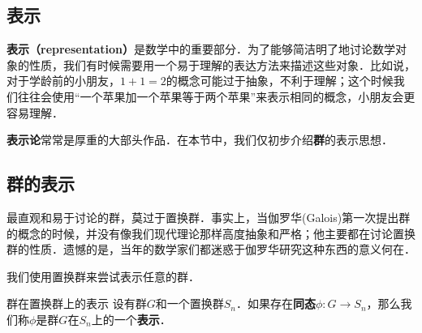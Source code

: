 \subsection{表示}

\textbf{表示（representation）}是数学中的重要部分．为了能够简洁明了地讨论数学对象的性质，我们有时候需要用一个易于理解的表达方法来描述这些对象．比如说，对于学龄前的小朋友，$1+1=2$的概念可能过于抽象，不利于理解；这个时候我们往往会使用“一个苹果加一个苹果等于两个苹果”来表示相同的概念，小朋友会更容易理解．

\textbf{表示论}常常是厚重的大部头作品．在本节中，我们仅初步介绍\textbf{群}的表示思想．

\subsection{群的表示}

最直观和易于讨论的群，莫过于置换群．事实上，当伽罗华(Galois)第一次提出群的概念的时候，并没有像我们现代理论那样高度抽象和严格；他主要都在讨论置换群的性质．遗憾的是，当年的数学家们都迷惑于伽罗华研究这种东西的意义何在．

我们使用置换群来尝试表示任意的群．

\begin{definition}{群在置换群上的表示}
设有群$G$和一个置换群$S_n$．如果存在\textbf{同态}$\phi: G\rightarrow S_n$，那么我们称$\phi$是群$G$在$S_n$上的一个\textbf{表示}．
\end{definition}